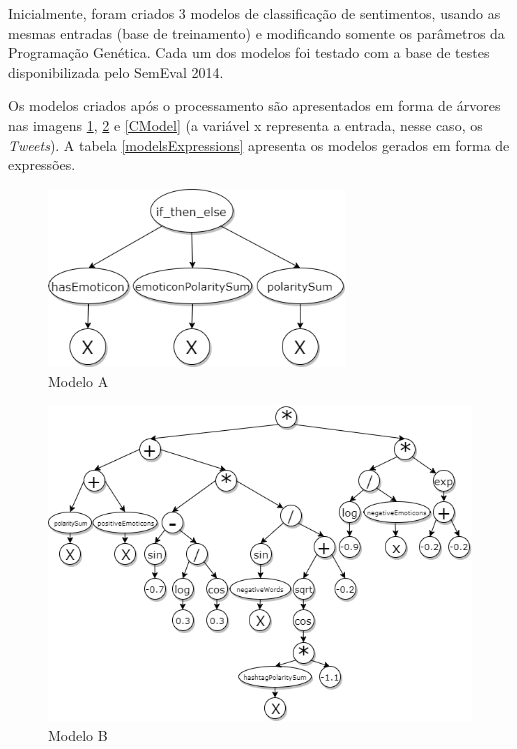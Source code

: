 \documentclass[12pt]{article}
\begin{document}
Inicialmente, foram criados 3 modelos de classificação de sentimentos, usando as mesmas entradas (base de treinamento) e modificando somente os parâmetros da Programação Genética. Cada um dos modelos foi testado com a base de testes disponibilizada pelo SemEval 2014.

Os modelos criados após o processamento são apresentados em forma de árvores nas imagens \ref{AModel}, \ref{BModel} e \ref{CModel} (a variável x representa a entrada, nesse caso, os \emph{Tweets}). A tabela \ref{modelsExpressions} apresenta os modelos gerados em forma de expressões.

	\begin{figure}[H]
		\centering
		\includegraphics[width=0.7\textwidth]{treeA2}
		\caption{Modelo A}
		\label{AModel}
	\end{figure}
	
	\begin{figure}[H]
		\centering
		\includegraphics[width=1.0\textwidth]{treeB3}
		\caption{Modelo B}
		\label{BModel}
	\end{figure}
\end{document}

